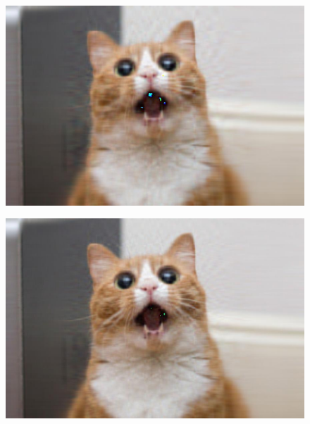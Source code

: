 \begin{sol}
\begin{figure}[h]
            \begin{minipage}[t]{.24\textwidth}
        \centering
        \includegraphics[width=1.1\textwidth]{21.jpg}
        \label{fig:p21}
    \end{minipage}
    \hfill
    \begin{minipage}[t]{.24\textwidth}
        \centering
        \includegraphics[width=1.1\textwidth]{31.jpg}
        \label{fig:p31}
    \end{minipage}  


\end{figure}
\end{sol}

